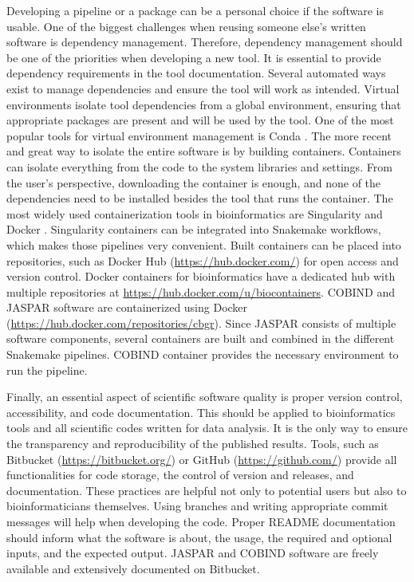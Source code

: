     Developing a pipeline or a package can be a personal choice if the software is usable. One of the biggest challenges when reusing someone else's written software is dependency management. Therefore, dependency management should be one of the priorities when developing a new tool. It is essential to provide dependency requirements in the tool documentation. Several automated ways exist to manage dependencies and ensure the tool will work as intended. Virtual environments isolate tool dependencies from a global environment, ensuring that appropriate packages are present and will be used by the tool. One of the most popular tools for virtual environment management is Conda \cite{anaconda}. The more recent and great way to isolate the entire software is by building containers. Containers can isolate everything from the code to the system libraries and settings. From the user's perspective, downloading the container is enough, and none of the dependencies need to be installed besides the tool that runs the container. The most widely used containerization tools in bioinformatics are Singularity and Docker \cite{kurtzer2017singularity,merkel2014docker}. Singularity containers can be integrated into Snakemake workflows, which makes those pipelines very convenient. Built containers can be placed into repositories, such as Docker Hub (\url{https://hub.docker.com/}) for open access and version control. Docker containers for bioinformatics have a dedicated hub with multiple repositories at \url{https://hub.docker.com/u/biocontainers}. COBIND and JASPAR software are containerized using Docker (\url{https://hub.docker.com/repositories/cbgr}). Since JASPAR consists of multiple software components, several containers are built and combined in the different Snakemake pipelines. COBIND container provides the necessary environment to run the pipeline.

    Finally, an essential aspect of scientific software quality is proper version control, accessibility, and code documentation. This should be applied to bioinformatics tools and all scientific codes written for data analysis. It is the only way to ensure the transparency and reproducibility of the published results. Tools, such as Bitbucket (\url{https://bitbucket.org/}) or GitHub (\url{https://github.com/}) provide all functionalities for code storage, the control of version and releases, and documentation. These practices are helpful not only to potential users but also to bioinformaticians themselves. Using branches and writing appropriate commit messages will help when developing the code. Proper README documentation should inform what the software is about, the usage, the required and optional inputs, and the expected output. JASPAR and COBIND software are freely available and extensively documented on Bitbucket.

